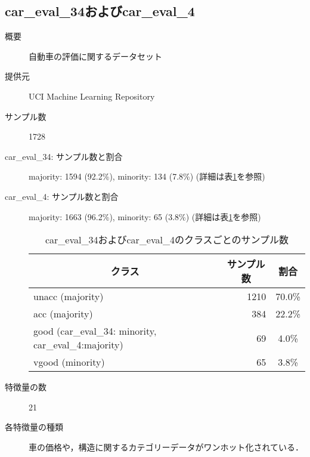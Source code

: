 \subsection{car\_eval\_34およびcar\_eval\_4}
\begin{description}
    \item[概要] 自動車の評価に関するデータセット\cite{careval}
    \item[提供元] UCI Machine Learning Repository
    \item[サンプル数] 1728
    \item[car\_eval\_34: サンプル数と割合] majority: 1594 (92.2\%), minority: 134 (7.8\%) (詳細は表\ref{tab:careval}を参照)
    \item[car\_eval\_4: サンプル数と割合] majority: 1663 (96.2\%), minority: 65 (3.8\%) (詳細は表\ref{tab:careval}を参照)

        \begin{table}[htbp]
            \centering
            \caption{car\_eval\_34およびcar\_eval\_4のクラスごとのサンプル数}
            \label{tab:careval}
            \begin{tabular}{lrc} \hline
                \multicolumn{1}{c}{クラス}&
                \multicolumn{1}{c}{サンプル数}&
                \multicolumn{1}{c}{割合}\\
                \hline
                \hline
                unacc (majority)& 1210 & 70.0\% \\
                acc (majority)& 384 & 22.2\% \\
                good (car\_eval\_34: minority, car\_eval\_4:majority)& 69 & 4.0\% \\
                vgood (minority)& 65 & 3.8\% \\
                \hline
            \end{tabular}
        \end{table}

    \item[特徴量の数] 21
    \item[各特徴量の種類] 車の価格や，構造に関するカテゴリーデータがワンホット化されている．
\end{description}


